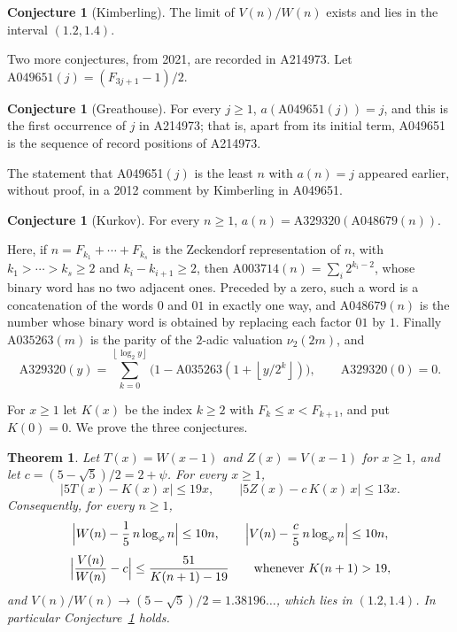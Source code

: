 \documentclass[]{interact}
\newcommand{\fl}[1]{\left\lfloor #1\right\rfloor}
\theoremstyle{plain}
\numberwithin{equation}{section}
\newtheorem{theorem}[thm]{Theorem}
\theoremstyle{definition}
\newtheorem{conjecture}[thm]{Conjecture}
\begin{document}
\begin{conjecture}[Kimberling]\label{conj:kim}
The limit of $V(n)/W(n)$ exists and lies in the interval $(1.2,1.4)$.
\end{conjecture}

Two more conjectures, from 2021, are recorded in A214973. Let $\mathrm{A049651}(j)=(F_{3j+1}-1)/2$.

\begin{conjecture}[Greathouse]\label{conj:gh}
For every $j\ge1$, $a(\mathrm{A049651}(j))=j$, and this is the first occurrence of $j$ in A214973; that is, apart from its initial term, A049651 is the sequence of record positions of A214973.
\end{conjecture}

The statement that A049651$(j)$ is the least $n$ with $a(n)=j$ appeared earlier, without proof, in a 2012 comment by Kimberling in A049651.

\begin{conjecture}[Kurkov]\label{conj:kur}
For every $n\ge1$, $a(n)=\mathrm{A329320}(\mathrm{A048679}(n))$.
\end{conjecture}

Here, if $n=F_{k_1}+\cdots+F_{k_s}$ is the Zeckendorf representation of $n$, with $k_1>\cdots>k_s\ge2$ and $k_i-k_{i+1}\ge2$, then $\mathrm{A003714}(n)=\sum_i 2^{k_i-2}$, whose binary word has no two adjacent ones. Preceded by a zero, such a word is a concatenation of the words $0$ and $01$ in exactly one way, and $\mathrm{A048679}(n)$ is the number whose binary word is obtained by replacing each factor $01$ by $1$. Finally $\mathrm{A035263}(m)$ is the parity of the $2$-adic valuation $\nu_2(2m)$, and
\[
\mathrm{A329320}(y)=\sum_{k=0}^{\fl{\log_2 y}}\bigl(1-\mathrm{A035263}(1+\fl{y/2^k})\bigr),\qquad \mathrm{A329320}(0)=0.
\]

For $x\ge1$ let $K(x)$ be the index $k\ge2$ with $F_k\le x<F_{k+1}$, and put $K(0)=0$. We prove the three conjectures.

\begin{theorem}\label{thm:kim}
Let $T(x)=W(x-1)$ and $Z(x)=V(x-1)$ for $x\ge1$, and let $c=(5-\sqrt5)/2=2+\psi$. For every $x\ge1$,
\begin{equation}\label{eq:bounds}
\bigl|5T(x)-K(x)\,x\bigr|\le 19x,\qquad \bigl|5Z(x)-c\,K(x)\,x\bigr|\le 13x.
\end{equation}
Consequently, for every $n\ge1$,
\begin{equation}\label{eq:asym}
\Bigl|W(n)-\frac15\,n\log_\varphi n\Bigr|\le 10n,\qquad \Bigl|V(n)-\frac c5\,n\log_\varphi n\Bigr|\le 10n,
\end{equation}
\begin{equation}\label{eq:rate}
\Bigl|\frac{V(n)}{W(n)}-c\Bigr|\le\frac{51}{K(n+1)-19}\qquad\text{whenever } K(n+1)>19,
\end{equation}
and $V(n)/W(n)\to(5-\sqrt5)/2=1.38196\ldots$, which lies in $(1.2,1.4)$. In particular Conjecture~\ref{conj:kim} holds.
\end{theorem}
\end{document}
